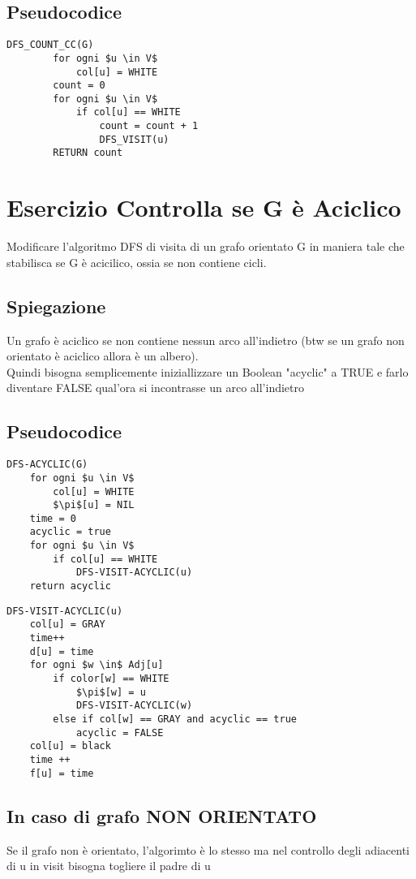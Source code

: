 \documentclass[12pt, a4paper, openany]{book}
\begin{document}
	\subsection*{Pseudocodice}
	\begin{lstlisting}[mathescape=true]
    DFS_COUNT_CC(G)
        for ogni $u \in V$
            col[u] = WHITE
        count = 0
        for ogni $u \in V$
            if col[u] == WHITE
                count = count + 1
                DFS_VISIT(u)
        RETURN count
\end{lstlisting}

	\section{Esercizio Controlla se G è Aciclico}
	Modificare l’algoritmo DFS di visita di un grafo orientato G in maniera tale che stabilisca
	se G è acicilico, ossia se non contiene cicli.
	\subsection*{Spiegazione}
	Un grafo è aciclico se non contiene nessun arco all'indietro (btw se un grafo non orientato è aciclico allora è un albero).
	\\Quindi bisogna semplicemente iniziallizzare un Boolean "acyclic" a TRUE e farlo diventare FALSE qual'ora si incontrasse un arco all'indietro

	\subsection*{Pseudocodice}
	\begin{lstlisting}[mathescape=true]
DFS-ACYCLIC(G)
    for ogni $u \in V$
        col[u] = WHITE
        $\pi$[u] = NIL
    time = 0
    acyclic = true
    for ogni $u \in V$
        if col[u] == WHITE
            DFS-VISIT-ACYCLIC(u)
    return acyclic    
\end{lstlisting}

	\begin{lstlisting}[mathescape=true]
DFS-VISIT-ACYCLIC(u)
    col[u] = GRAY
    time++
    d[u] = time
    for ogni $w \in$ Adj[u]
        if color[w] == WHITE
            $\pi$[w] = u
            DFS-VISIT-ACYCLIC(w)
        else if col[w] == GRAY and acyclic == true
            acyclic = FALSE
    col[u] = black
    time ++
    f[u] = time
\end{lstlisting}

	\subsection*{In caso di grafo NON ORIENTATO}
	Se il grafo non è orientato, l'algorimto è lo stesso ma nel controllo degli adiacenti di u in visit bisogna togliere il padre di u
\end{document}
